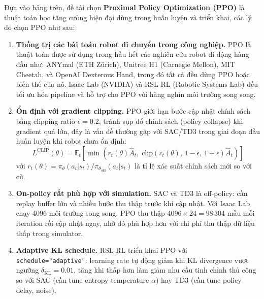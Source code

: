 Đựa vào bảng trên, đề tài chọn
\textbf{Proximal Policy Optimization (PPO)} \cite{schulman2017ppo} là thuật toán học tăng cường hiện đại dùng trong huấn luyện và triển khai, các lý do chọn PPO như sau:

\begin{enumerate}
    \item \textbf{Thống trị các bài toán robot di chuyển trong công nghiệp.} PPO là thuật toán
    được sử dụng trong hầu hết các nghiên cứu robot di động hàng đầu như:
    ANYmal (ETH Zürich), Unitree H1 (Carnegie Mellon), MIT Cheetah, và
    OpenAI Dexterous Hand, trong đó tất cả đều dùng PPO hoặc biến thể của nó.
    Isaac Lab (NVIDIA) và RSL-RL (Robotic Systems Lab) đều tối ưu hóa 
    pipeline và hỗ trợ cho PPO với hàng nghìn môi trường song song.

    \item \textbf{Ổn định với gradient clipping.} PPO giới hạn bước cập nhật
    chính sách bằng clipping ratio $\epsilon = 0.2$, tránh sụp đổ chính sách 
    (policy collapse) khi gradient quá lớn, đây là vấn đề thường gặp với SAC/TD3
    trong giai đoạn đầu huấn luyện khi robot chưa ổn định:
    \begin{equation}
        L^{\text{CLIP}}(\theta) = \mathbb{E}_t\!\left[
            \min\!\left(r_t(\theta)\hat{A}_t,\;
            \text{clip}\!\left(r_t(\theta),\,1{-}\epsilon,\,1{+}\epsilon\right)\hat{A}_t
            \right)
        \right]
        \label{eq:ppo_clip}
    \end{equation}
    với $r_t(\theta) = \pi_\theta(a_t|s_t)/\pi_{\theta_\text{old}}(a_t|s_t)$
    là tỉ lệ xác suất chính sách mới so với cũ.

    \item \textbf{On-policy rất phù hợp với simulation.} SAC và TD3 là off-policy:
    cần replay buffer lớn và nhiều bước thu thập trước khi cập nhật.
    Với Isaac Lab chạy 4096 môi trường song song, PPO thu thập
    $4096 \times 24 = 98\,304$ mẫu mỗi iteration rồi cập nhật ngay, nhờ đó phù hợp hơn với chi phí thu thập dữ liệu thấp trong simulator.


    \item \textbf{Adaptive KL schedule.} RSL-RL triển khai PPO với
    \texttt{schedule="adaptive"}: learning rate tự động giảm khi KL
    divergence vượt ngưỡng $\delta_\text{KL} = 0.01$, tăng khi thấp hơn làm giảm nhu cầu tinh chỉnh thủ công so với SAC (cần tune entropy
    temperature $\alpha$) hay TD3 (cần tune policy delay, noise).
\end{enumerate}

